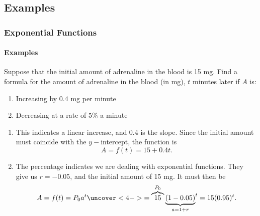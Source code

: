 \documentclass[9pt,xcolor=x11names,compress]{beamer}
\begin{document}
\subsection{Examples}
\begin{frame}
\frametitle{Exponential Functions}\framesubtitle{Examples}
\begin{example}
   Suppose that the initial amount of adrenaline in the blood is 15 mg.  Find a formula for the amount of adrenaline in the blood (in mg), $t$ minutes later if $A$ is:
   \begin{enumerate}
        \item \alert<2>{Increasing by 0.4 mg per minute}
        \item \alert<3>{Decreasing at a rate of 5\% a minute}
    \end{enumerate} 
\end{example}
\pause
\begin{enumerate}
    \item<2-> This indicates a linear increase, and 0.4 is the slope.  Since the initial amount must coincide with the $y-$intercept, the function is 
    \begin{equation*}
    A=f(t)=15+0.4t.
    \end{equation*}
    \item<3-> The percentage indicates we are dealing with exponential functions.  They give us $r=-0.05$, and the initial amount of 15 mg.  It must then be 
    \begin{equation*}
    A=f(t)=P_0 a^t \uncover<4->{= \overbrace{15}^{P_0} {\underbrace{(1-0.05)}_{a=1+r}}^t=15(0.95)^t.}
    \end{equation*}
\end{enumerate}
\end{frame}
\end{document}
